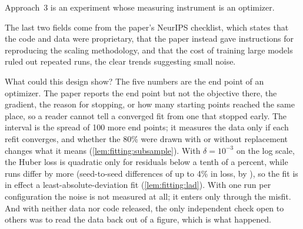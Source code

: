 \begin{refsection}
Approach~3 is an experiment whose measuring instrument is an optimizer.

\begin{experiment}
\end{experiment}

The last two fields come from the paper's NeurIPS checklist, which states that the code and data were proprietary, that the paper instead gave instructions for reproducing the scaling methodology, and that the cost of training large models ruled out repeated runs, the clear trends suggesting small noise.

What could this design show? The five numbers are the end point of an optimizer. The paper reports the end point but not the objective there, the gradient, the reason for stopping, or how many starting points reached the same place, so a reader cannot tell a converged fit from one that stopped early. The interval is the spread of 100 more end points; it measures the data only if each refit converges, and whether the 80\% were drawn with or without replacement changes what it means (\cref{lem:fitting:subsample}). With $\delta=10^{-3}$ on the log scale, the Huber loss is quadratic only for residuals below a tenth of a percent, while runs differ by more (seed-to-seed differences of up to 4\% in loss, by \textcite{ChoshenEtAl2025}), so the fit is in effect a least-absolute-deviation fit (\cref{lem:fitting:lad}). With one run per configuration the noise is not measured at all; it enters only through the misfit. And with neither data nor code released, the only independent check open to others was to read the data back out of a figure, which is what happened.


\end{refsection}
